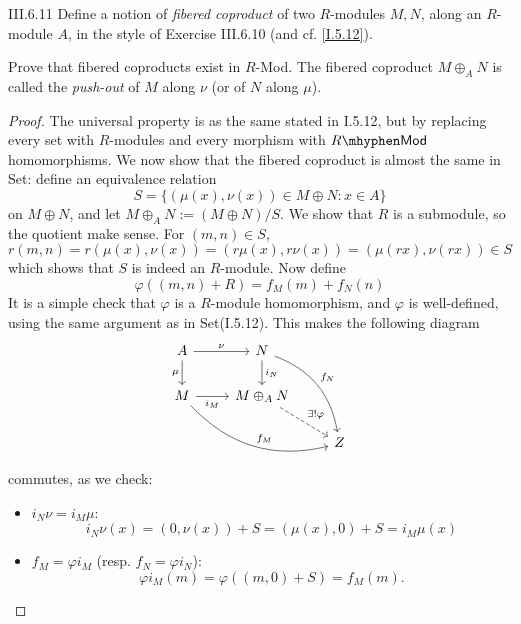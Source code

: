 \begin{problem}{III.6.11}
Define a notion of \emph{fibered coproduct} of two $R$-modules $M, N$, along an $R$-module $A$, in the style of Exercise III.6.10 (and cf. \ref{I.5.12}).

Prove that fibered coproducts exist in $R$-\textsf{Mod}. The fibered coproduct $M \oplus_A N$ is called the \emph{push-out} of $M$ along $\nu$ (or of $N$ along $\mu$).
\end{problem}
\begin{proof}
The universal property is as the same stated in I.5.12, but by replacing every set with $R$-modules and every morphism with $R\mhyphen\mathsf{Mod}$ homomorphisms. We now show that the fibered coproduct is almost the same in \textsf{Set}: define an equivalence relation
\[
S = \{(\mu(x), \nu(x)) \in M \oplus N : x \in A\}
\]
on $M \oplus N$, and let $M \oplus_A N := (M \oplus N)/S$. We show that $R$ is a submodule, so the quotient make sense. For $(m,n) \in S$,
\[
r(m,n) = r(\mu(x),\nu(x)) = (r\mu(x), r\nu(x)) = (\mu(rx), \nu(rx)) \in S	
\]
which shows that $S$ is indeed an $R$-module. Now define
\[
\varphi((m,n)+R) = f_M(m) + f_N(n)	
\]
It is a simple check that $\varphi$ is a $R$-module homomorphism, and $\varphi$ is well-defined, using the same argument as in \textsf{Set}(I.5.12). This makes the following diagram 
\[
\begin{tikzcd}
A \arrow[r, "\nu"] \arrow[d, "\mu"']       & N \arrow[d, "i_N"] \arrow[rdd, "f_N", bend left]          &   \\
M \arrow[r, "i_M"'] \arrow[rrd, "f_M", bend right] & M \oplus_A N \arrow[rd, "\exists!\varphi", dashed] &   \\
&                                                    & Z
\end{tikzcd}	
\]
commutes, as we check:
\begin{itemize}
\item $i_N \nu = i_M \mu$:
\[
i_N \nu (x) = (0, \nu(x)) + S = (\mu(x), 0) + S = i_M \mu(x)
\]
\item $f_M = \varphi i_M $ (resp. $f_N = \varphi i_N$):
\[
\varphi	i_M (m) = \varphi((m,0)+S) = f_M(m).
\]
\end{itemize}
\end{proof}



